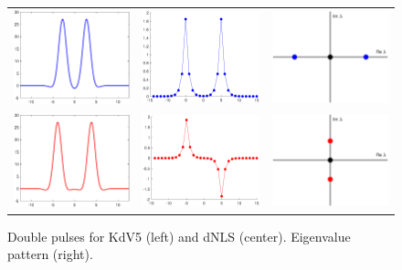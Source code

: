 \documentclass[12pt,reqno,oneside]{article}
\theoremstyle{definition}
\theoremstyle{remark}
\begin{document}
\begin{figure}
\centering
\begin{tabular}{ccc}
\includegraphics[width=4cm]{images/dp1.eps} &
\includegraphics[width=4cm]{images/dnls2unstable.eps} &
\includegraphics[width=4cm]{images/unstableeigpattern.eps} \\
\includegraphics[width=4cm]{images/dp2.eps} &
\includegraphics[width=4cm]{images/dnls2stable.eps} &
\includegraphics[width=4cm]{images/stableeigpattern.eps} 
\end{tabular}
\caption{Double pulses for KdV5 (left) and dNLS (center). Eigenvalue pattern (right).}
\label{fig:eigpatterns}
\end{figure}
\end{document}
